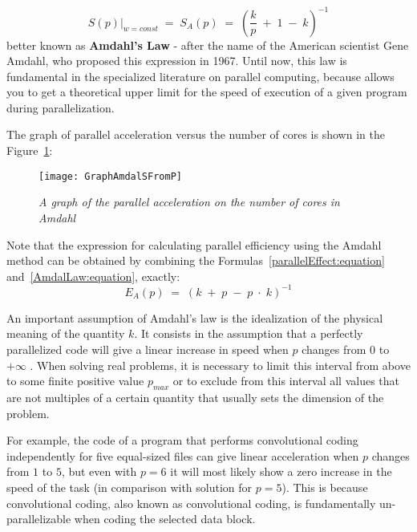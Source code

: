 {	\begin{equation}
		\label{AmdalLaw:equation}
		\left.S(p)\right|_{w=const}\;=\;S_A(p)\;=\;\left(\frac kp\;+\;1\;-\;k\right)^{-1}
	\end{equation}
	better known as \textbf{Amdahl’s Law} - after the name of the American scientist Gene Amdahl, who proposed this expression in 1967. Until now, this law is fundamental in the specialized literature on parallel computing, because allows you to get a theoretical upper limit for the speed of execution of a given program during parallelization.
	\par The graph of parallel acceleration versus the number of cores is shown in the Figure~\ref{GraphAmdalSFromP:image}:
	\begin{figure}[H]
		\texttt{[image: GraphAmdalSFromP]}
		\caption{\textit{A graph of the parallel acceleration on the number of cores in Amdahl}}
		\label{GraphAmdalSFromP:image}
	\end{figure}
	\par Note that the expression for calculating parallel efficiency using the Amdahl method can be obtained by combining the Formulas~\eqref{parallelEffect:equation} and~\eqref{AmdalLaw:equation}, exactly:
	\begin{equation}
		E_A(p)\;=\;\left(k\;+\;p\;-\;p\;\cdot\;k\right)^{-1}
	\end{equation}
	\par An important assumption of Amdahl's law is the idealization of the physical meaning of the quantity $k$. It consists in the assumption that a perfectly parallelized code will give a linear increase in speed when $ p $ changes from $0$ to $+\infty$ . When solving real problems, it is necessary to limit this interval from above to some finite positive value $p_{max}$ or to exclude from this interval all values that are not multiples of a certain quantity that usually sets the dimension of the problem.
	\par For example, the code of a program that performs convolutional coding independently for five equal-sized files can give linear acceleration when $p$ changes from $1$ to $5$, but even with $p = 6$ it will most likely show a zero increase in the speed of the task (in comparison with solution for $p = 5$). This is because convolutional coding, also known as convolutional coding, is fundamentally un-parallelizable when coding the selected data block.
	\par
}